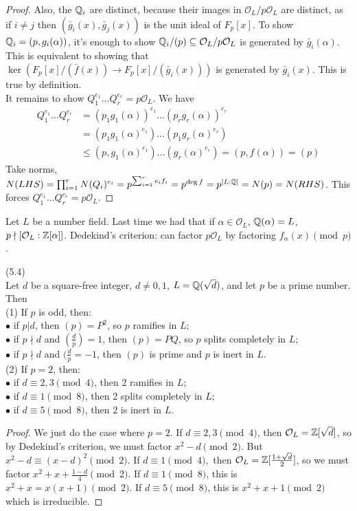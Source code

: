 \documentclass[a4paper]{article}
\begin{document}
\begin{proof}
Also, the $\mathbb{Q}_i$ are distinct, because their images in $\mathcal{O}_L/p\mathcal{O}_L$ are distinct, as if $i \neq j$ then $(\bar{g}_i(x),\bar{g}_j(x))$ is the unit ideal of $F_p[x]$. To show $\mathbb{Q}_i = (p,g_i(\alpha))$, it's enough to show $\mathbb{Q}_i/(p) \subseteq \mathcal{O}_L/p\mathcal{O}_L$ is generated by $\bar{g}_i(\alpha)$. This is equivalent to showing that $\ker(F_p[x] / (\bar{f}(x)) \to F_p[x]/(\bar{g}_i(x)))$ is generated by $\bar{g}_i(x)$. This is true by definition.\\
It remains to show $Q_1^{e_1}...Q_r^{e_r} = p\mathcal{O}_L$. We have
\begin{equation*}
\begin{aligned}
Q_1^{e_1}...Q_r^{e_r} &= (p_1g_1(\alpha))^{e_1}...(p_rg_r(\alpha))^{e_r}\\
&=(p_1g_1(\alpha)^{e_1}) ... (p_1g_r(\alpha)^{e_r})\\
&\leq (p,g_1(\alpha)^{e_1})...(g_r(\alpha)^{e_r}) = (p,f(\alpha))=(p)
\end{aligned}
\end{equation*}
Take norms, $N(LHS) = \prod_{i=1}^r N(Q_i)^{e_i} = p^{\sum_{i=1}^r e_i f_i} =p^{\deg f} = p^{[L:\mathbb{Q}]} = N(p) = N(RHS)$. This forces $Q_1^{e_1}...Q_r^{e_r} = p\mathcal{O}_L$.
\end{proof}

Let $L$ be a number field. Last time we had that if $\alpha \in \mathcal{O}_L$, $\mathbb{Q}(\alpha) = L$, $p \nmid [\mathcal{O}_L:\mathbb{Z}[\alpha]]$. Dedekind's criterion: can factor $p\mathcal{O}_L$ by factoring $f_\alpha(x) \pmod p$.

\begin{prop} (5.4)\\
Let $d$ be a square-free integer, $d \neq 0,1$, $L = \mathbb{Q}(\sqrt{d})$, and let $p$ be a prime number. Then\\
(1) If $p$ is odd, then:\\
$\bullet$ if $p|d$, then $(p) = P^2$, so $p$ ramifies in $L$;\\
$\bullet$ if $p \nmid d$ and $(\frac{d}{p}) = 1$, then $(p) = PQ$, so $p$ splits completely in $L$;\\
$\bullet$ if $p \nmid d$ and $(\frac{d}{p} = -1$, then $(p)$ is prime and $p$ is inert in $L$.\\
(2) If $p=2$, then:\\
$\bullet$ if $d \equiv 2,3 \pmod 4$, then 2 ramifies in $L$;\\
$\bullet$ if $d \equiv 1 \pmod 8$, then 2 splits completely in $L$;\\
$\bullet$ if $d \equiv 5 \pmod 8$, then $2$ is inert in $L$.
\begin{proof}
We just do the case where $p=2$. If $d \equiv 2,3 \pmod 4$, then $\mathcal{O}_L = \mathbb{Z}[\sqrt{d}]$, so by Dedekind's criterion, we must factor $x^2 - d \pmod 2$. But $x^2-d \equiv (x-d)^2 \pmod 2$. If $d \equiv 1 \pmod 4,$ then $\mathcal{O}_L = \mathbb{Z}[\frac{1+\sqrt{d}}{2}]$, so we must factor $x^2+x+\frac{1-d}{4} \pmod 2$. If $d \equiv 1 \pmod 8$, this is $x^2+x = x(x+1) \pmod 2$. If $d \equiv 5 \pmod 8$, this is $x^2+x+1 \pmod 2$ which is irreducible.
\end{proof}
\end{prop}
\end{document}
